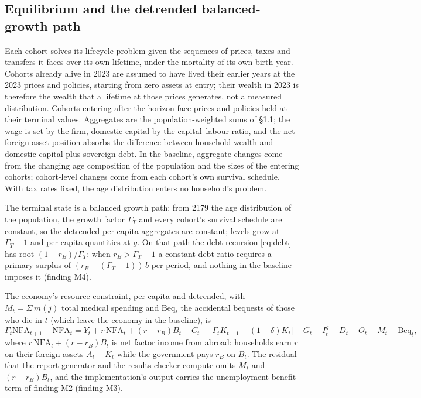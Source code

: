 \documentclass[11pt,a4paper]{article}
\begin{document}
\subsection{Equilibrium and the detrended balanced-growth path}

Each cohort solves its lifecycle problem given the sequences of prices, taxes and transfers it faces over its own lifetime, under the mortality of its own birth year. Cohorts already alive in 2023 are assumed to have lived their earlier years at the 2023 prices and policies, starting from zero assets at entry; their wealth in 2023 is therefore the wealth that a lifetime at those prices generates, not a measured distribution. Cohorts entering after the horizon face prices and policies held at their terminal values. Aggregates are the population-weighted sums of \S1.1; the wage is set by the firm, domestic capital by the capital--labour ratio, and the net foreign asset position absorbs the difference between household wealth and domestic capital plus sovereign debt. In the baseline, aggregate changes come from the changing age composition of the population and the sizes of the entering cohorts; cohort-level changes come from each cohort's own survival schedule. With tax rates fixed, the age distribution enters no household's problem.

The terminal state is a balanced growth path: from 2179 the age distribution of the population, the growth factor $\Gamma_T$ and every cohort's survival schedule are constant, so the detrended per-capita aggregates are constant; levels grow at $\Gamma_T - 1$ and per-capita quantities at $g$. On that path the debt recursion \eqref{eq:debt} has root $(1+r_B)/\Gamma_T$: when $r_B > \Gamma_T - 1$ a constant debt ratio requires a primary surplus of $(r_B - (\Gamma_T - 1))\,b$ per period, and nothing in the baseline imposes it (finding M4).

The economy's resource constraint, per capita and detrended, with $M_t = \Sigma\, m(j)$ total medical spending and $\mathrm{Beq}_t$ the accidental bequests of those who die in $t$ (which leave the economy in the baseline), is
\[
\Gamma_t\mathrm{NFA}_{t+1} - \mathrm{NFA}_t = Y_t + r\,\mathrm{NFA}_t + (r - r_B) B_t - C_t - \bigl[\Gamma_t K_{t+1} - (1-\delta)K_t\bigr] - G_t - I^g_t - D_t - O_t - M_t - \mathrm{Beq}_t ,
\]
where $r\,\mathrm{NFA}_t + (r - r_B)B_t$ is net factor income from abroad: households earn $r$ on their foreign assets $A_t - K_t$ while the government pays $r_B$ on $B_t$. The residual that the report generator and the results checker compute omits $M_t$ and $(r - r_B)B_t$, and the implementation's output carries the unemployment-benefit term of finding M2 (finding M3).
\end{document}
